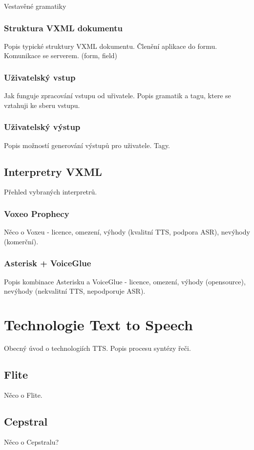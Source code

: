 \documentclass[ing,male,java,dept460]{diploma}						%
\begin{document}
Vestavěné gramatiky

\subsubsection{Struktura VXML dokumentu}
Popis typické struktury VXML dokumentu. Členění aplikace do formu. Komunikace se serverem. (form, field)

\subsubsection{Uživatelský vstup}
Jak funguje zpracování vstupu od uřivatele. Popis gramatik a tagu, ktere se vztahuji ke sberu vstupu.

\subsubsection{Uživatelský výstup}
Popis možností generování výstupů pro uživatele. Tagy.

\subsection{Interpretry VXML}
Přehled vybraných interpretrů.

\subsubsection{Voxeo Prophecy}
\label{sec:Voxeo_interpreter}
Něco o Voxeu - licence, omezení, výhody (kvalitní TTS, podpora ASR), nevýhody (komerční).

\subsubsection{Asterisk + VoiceGlue}
Popis kombinace Asterisku a VoiceGlue - licence, omezení, výhody (opensource), nevýhody (nekvalitní TTS, nepodporuje ASR).

\section{Technologie Text to Speech}
\label{sec:TTS}
Obecný úvod o technologiích TTS. Popis procesu syntézy řeči.

\subsection{Flite}
Něco o Flite.

\subsection{Cepstral}
Něco o Cepstralu?
\end{document}
